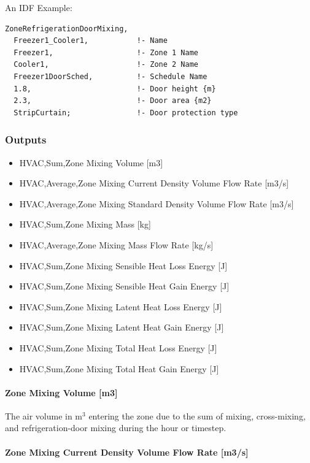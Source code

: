 An IDF Example:

\begin{lstlisting}
ZoneRefrigerationDoorMixing,
  Freezer1_Cooler1,           !- Name
  Freezer1,                   !- Zone 1 Name
  Cooler1,                    !- Zone 2 Name
  Freezer1DoorSched,          !- Schedule Name
  1.8,                        !- Door height {m}
  2.3,                        !- Door area {m2}
  StripCurtain;               !- Door protection type
\end{lstlisting}

\subsubsection{Outputs}\label{outputs-5-000}

\begin{itemize}
\item
  HVAC,Sum,Zone Mixing Volume {[}m3{]}
\item
  HVAC,Average,Zone Mixing Current Density Volume Flow Rate {[}m3/s{]}
\item
  HVAC,Average,Zone Mixing Standard Density Volume Flow Rate {[}m3/s{]}
\item
  HVAC,Sum,Zone Mixing Mass {[}kg{]}
\item
  HVAC,Average,Zone Mixing Mass Flow Rate {[}kg/s{]}
\item
  HVAC,Sum,Zone Mixing Sensible Heat Loss Energy {[}J{]}
\item
  HVAC,Sum,Zone Mixing Sensible Heat Gain Energy {[}J{]}
\item
  HVAC,Sum,Zone Mixing Latent Heat Loss Energy {[}J{]}
\item
  HVAC,Sum,Zone Mixing Latent Heat Gain Energy {[}J{]}
\item
  HVAC,Sum,Zone Mixing Total Heat Loss Energy {[}J{]}
\item
  HVAC,Sum,Zone Mixing Total Heat Gain Energy {[}J{]}
\end{itemize}

\paragraph{Zone Mixing Volume {[}m3{]}}\label{zone-mixing-volume-m3-2}

The air volume in m\(^{3}\) entering the zone due to the sum of mixing, cross-mixing, and refrigeration-door mixing during the hour or timestep.

\paragraph{Zone Mixing Current Density Volume Flow Rate {[}m3/s{]}}\label{zone-mixing-current-density-volumetric-flow-rate-m3s-2}

